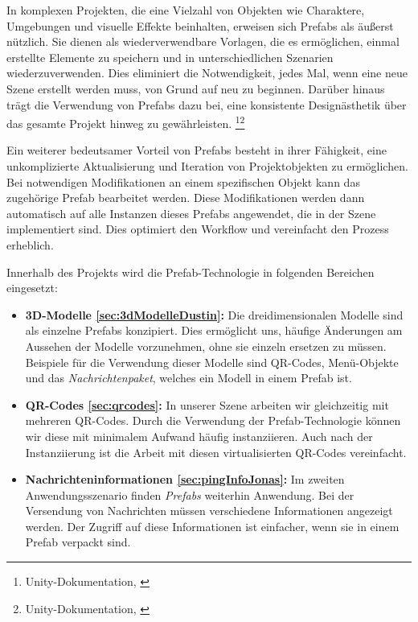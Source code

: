 In komplexen Projekten, die eine Vielzahl von Objekten wie Charaktere, Umgebungen und visuelle Effekte beinhalten, erweisen sich Prefabs als äußerst nützlich. Sie dienen als wiederverwendbare Vorlagen, die es ermöglichen, einmal erstellte Elemente zu speichern und in unterschiedlichen Szenarien wiederzuverwenden. Dies eliminiert die Notwendigkeit, jedes Mal, wenn eine neue Szene erstellt werden muss, von Grund auf neu zu beginnen. Darüber hinaus trägt die Verwendung von Prefabs dazu bei, eine konsistente Designästhetik über das gesamte Projekt hinweg zu gewährleisten. \footnote{Unity-Dokumentation, \cite{Prefabs}}\footnote{Unity-Dokumentation, \cite{Prefabs2}}


Ein weiterer bedeutsamer Vorteil von Prefabs besteht in ihrer Fähigkeit, eine unkomplizierte Aktualisierung und Iteration von Projektobjekten zu ermöglichen. Bei notwendigen Modifikationen an einem spezifischen Objekt kann das zugehörige Prefab bearbeitet werden. Diese Modifikationen werden dann automatisch auf alle Instanzen dieses Prefabs angewendet, die in der Szene implementiert sind. Dies optimiert den Workflow und vereinfacht den Prozess erheblich.

Innerhalb des Projekts wird die Prefab-Technologie in folgenden Bereichen eingesetzt:
\begin{itemize}
    \item \textbf{3D-Modelle \ref{sec:3dModelleDustin}:} Die dreidimensionalen Modelle sind als einzelne Prefabs konzipiert. Dies ermöglicht uns, häufige Änderungen am Aussehen der Modelle vorzunehmen, ohne sie einzeln ersetzen zu müssen. Beispiele für die Verwendung dieser Modelle sind QR-Codes, Menü-Objekte und das \textit{Nachrichtenpaket}, welches ein Modell in einem Prefab ist.
    \item \textbf{QR-Codes \ref{sec:qrcodes}:} In unserer Szene arbeiten wir gleichzeitig mit mehreren QR-Codes. Durch die Verwendung der Prefab-Technologie können wir diese mit minimalem Aufwand häufig instanziieren. Auch nach der Instanziierung ist die Arbeit mit diesen virtualisierten QR-Codes vereinfacht.
    \item \textbf{Nachrichteninformationen \ref{sec:pingInfoJonas}:} Im zweiten Anwendungsszenario finden \textit{Prefabs} weiterhin Anwendung. Bei der Versendung von Nachrichten müssen verschiedene Informationen angezeigt werden. Der Zugriff auf diese Informationen ist einfacher, wenn sie in einem Prefab verpackt sind.
\end{itemize}

